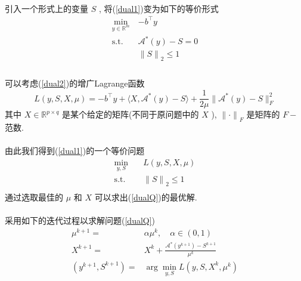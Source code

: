 \documentclass[a4paper, UTF8]{ctexart}
\numberwithin{equation}{section}  %
\begin{document}
			\paragraph{}
				\quad 引入一个形式上的变量 $S$ , 将(\ref{dual1})变为如下的等价形式
				\begin{equation}
					\begin{split}\label{dual2}
						\min_{y \in \mathbb{R}^{m}}
							& -b^\top y\\
						\text{s.t.} \quad
							& \mathcal{A}^*(y) - S = 0\\
							& {\lVert{S}\rVert}_2 \le 1\\
					\end{split}
				\end{equation}

			\paragraph{}
				\quad 可以考虑(\ref{dual2})的增广Lagrange函数
				\begin{equation}\label{Lag}
						L(y, S, X, \mu)
					=	-b^\top y + \langle{X, \mathcal{A}^*(y) - S}\rangle + \frac{1}{2\mu} \lVert{\mathcal{A}^*(y) - S}\rVert^2_F
				\end{equation}
				其中 $X \in \mathbb{R}^{p \times q}$ 是某个给定的矩阵(不同于原问题中的 $X$ ), ${\lVert{\cdot}\rVert}_F$ 是矩阵的 $F-$范数.

			\paragraph{}
				\quad 由此我们得到(\ref{dual1})的一个等价问题
				\begin{equation}
					\begin{split}\label{dualQ}
						\min_{y,S} \quad
							& L(y, S, X, \mu)\\
						\text{s.t.} \quad
							& {\lVert{S}\rVert}_2 \le 1\\
					\end{split}
				\end{equation}
				通过选取最佳的 $\mu$ 和 $X$ 可以求出(\ref{dualQ})的最优解.


			\paragraph{}
				\quad 采用如下的迭代过程以求解问题(\ref{dualQ})
				\begin{equation}
					\begin{split}\label{dualA}
							\mu^{k + 1}
						=	& \alpha \mu^k, \quad \alpha \in (0,1)\\
							X^{k + 1}
						=	& X^k + \frac{\mathcal{A}^*(y^{k + 1}) - S^{k + 1}}{\mu^k}\\
							(y^{k + 1}, S^{k + 1}) 
						=	& \arg \min_{y, S}L(y, S, X^k, \mu^k)
					\end{split}
				\end{equation}
\end{document}

